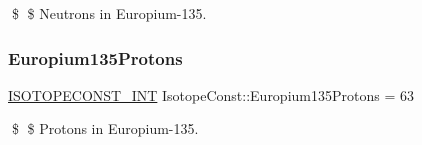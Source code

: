 \$ \$ Neutrons in Europium-\/135. \mbox{\label{group___isotope_const-_europium-_eu135_gabc476120b0c6478a1d86ec2c2dddd96f}} 
\subsubsection{\texorpdfstring{Europium135\+Protons}{Europium135Protons}}
{\footnotesize\ttfamily \mbox{\hyperlink{group___isotope_const-_macros_ga5f18360b3e99483a35c32d789e62621c}{I\+S\+O\+T\+O\+P\+E\+C\+O\+N\+S\+T\+\_\+\+I\+NT}} Isotope\+Const\+::\+Europium135\+Protons = 63}

\$ \$ Protons in Europium-\/135. 